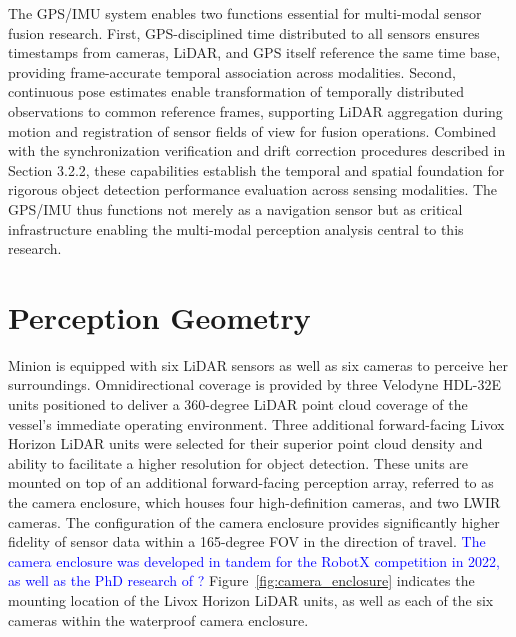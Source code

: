 \documentclass{erauthesis}
\begin{document}
The \ac{GPS}/\ac{IMU} system enables two functions essential for multi-modal sensor fusion research.
First, \ac{GPS}-disciplined time distributed to all sensors ensures timestamps from cameras, \ac{LiDAR}, and \ac{GPS} itself reference the same time base, providing frame-accurate temporal association across modalities.
Second, continuous pose estimates enable transformation of temporally distributed observations to common reference frames, supporting \ac{LiDAR} aggregation during motion and registration of sensor fields of view for fusion operations.
Combined with the synchronization verification and drift correction procedures described in Section 3.2.2, these capabilities establish the temporal and spatial foundation for rigorous object detection performance evaluation across sensing modalities.
The \ac{GPS}/\ac{IMU} thus functions not merely as a navigation sensor but as critical infrastructure enabling the multi-modal perception analysis central to this research.

\section{Perception Geometry} \label{perception_geometry}

Minion is equipped with six \ac{LiDAR} sensors as well as six cameras to perceive her surroundings.
Omnidirectional coverage is provided by three Velodyne HDL-32E units positioned to deliver a 360-degree \ac{LiDAR} point cloud coverage of the vessel's immediate operating environment.
Three additional forward-facing Livox Horizon \ac{LiDAR} units were selected for their superior point cloud density and ability to facilitate a higher resolution for object detection.
These units are mounted on top of an additional forward-facing perception array, referred to as the camera enclosure, which houses four high-definition cameras, and two \ac{LWIR} cameras.
The configuration of the camera enclosure provides significantly higher fidelity of sensor data within a 165-degree \ac{FOV} in the direction of travel.
\textcolor{blue}{The camera enclosure was developed in tandem for the RobotX competition in 2022, as well as the PhD research of \cite{thompson2023}?}
Figure~\ref{fig:camera_enclosure} indicates the mounting location of the Livox Horizon LiDAR units, as well as each of the six cameras within the waterproof camera enclosure. 
\end{document}
